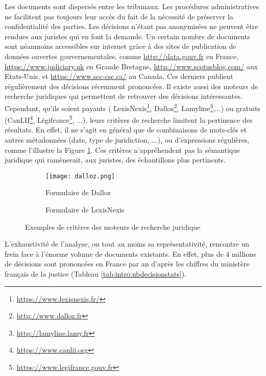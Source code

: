 Les documents sont dispersés entre les tribunaux. Les procédures administratives ne facilitent pas toujours leur accès du fait de la nécessité de préserver la confidentialité des parties. Les décisions n'étant pas anonymisées ne peuvent être rendues aux juristes qui en font la demande. Un certain nombre de documents sont néanmoins accessibles sur internet grâce à des sites de publication de données ouvertes gouvernementales, comme \url{http://data.gouv.fr} en France, \url{https://www.judiciary.uk} en Grande Bretagne, \url{http://www.scotusblog.com/} aux Etats-Unis, et \url{https://www.scc-csc.ca/} au Canada. Ces derniers publient régulièrement des décisions récemment prononcées.  Il existe aussi des moteurs de recherche juridiques qui permettent de retrouver des décisions intéressantes. Cependant, qu'ils soient payants ( LexisNexis\footnote{\url{https://www.lexisnexis.fr/}}, Dalloz\footnote{\url{http://www.dalloz.fr}}, Lamyline\footnote{\url{http://lamyline.lamy.fr}},...) ou gratuits (CanLII\footnote{\url{https://www.canlii.org}}, Légifrance\footnote{\url{https://www.legifrance.gouv.fr}}, ...), leurs critères de recherche limitent la pertinence des résultats. En effet, il ne s'agit en général que de combinaisons de mots-clés et autres métadonnées (date, type de juridiction, ...), ou d'expressions régulières, comme l'illustre la Figure \ref{fig:intro:juriSearchForm}. Ces critères n'appréhendent pas la sémantique juridique qui ramènerait, aux juristes, des échantillons plus pertinents. 

\begin{figure}[!htb]
	\centering

	\begin{subfigure}[t]{0.45\textwidth}
		\centering
		\texttt{[image: dalloz.png]}
		\caption{Formulaire de Dalloz}
	\end{subfigure}\hfill
	\begin{subfigure}[t]{0.55\textwidth}
		\centering
		\caption{Formulaire de LexisNexis}
	\end{subfigure}%
	\caption{Exemples de critères des moteurs de recherche juridique}\label{fig:intro:juriSearchForm}
\end{figure}

L'exhaustivité de l'analyse, ou tout au moins sa représentativité, rencontre un frein face à l'énorme volume de documents existants. En effet, plus de 4 millions de décisions sont prononcées en France par an d'après les chiffres du ministère français de la justice (Tableau \ref{tab:intro:nbdecisionstats}). 

